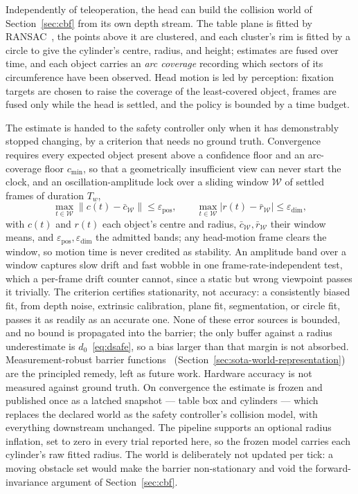 Independently of teleoperation, the head can build the collision world of Section~\ref{sec:cbf} from its own depth stream. The table plane is fitted by RANSAC~\cite{fischler1981ransac}, the points above it are clustered, and each cluster's rim is fitted by a circle to give the cylinder's centre, radius, and height; estimates are fused over time, and each object carries an \emph{arc coverage} recording which sectors of its circumference have been observed. Head motion is led by perception: fixation targets are chosen to raise the coverage of the least-covered object, frames are fused only while the head is settled, and the policy is bounded by a time budget.

The estimate is handed to the safety controller only when it has demonstrably stopped changing, by a criterion that needs no ground truth. Convergence requires every expected object present above a confidence floor and an arc-coverage floor $c_{\min}$, so that a geometrically insufficient view can never start the clock, and an oscillation-amplitude lock over a sliding window $\mathcal{W}$ of settled frames of duration $T_w$,
\begin{equation}
\max_{t \in \mathcal{W}} \bigl\|c(t) - \bar{c}_{\mathcal{W}}\bigr\| \le \varepsilon_{\text{pos}},
\qquad
\max_{t \in \mathcal{W}} \bigl|r(t) - \bar{r}_{\mathcal{W}}\bigr| \le \varepsilon_{\text{dim}},
\label{eq:amplock}
\end{equation}
with $c(t)$ and $r(t)$ each object's centre and radius, $\bar{c}_{\mathcal{W}}, \bar{r}_{\mathcal{W}}$ their window means, and $\varepsilon_{\text{pos}}, \varepsilon_{\text{dim}}$ the admitted bands; any head-motion frame clears the window, so motion time is never credited as stability. An amplitude band over a window captures slow drift and fast wobble in one frame-rate-independent test, which a per-frame drift counter cannot, since a static but wrong viewpoint passes it trivially. The criterion certifies stationarity, not accuracy: a consistently biased fit, from depth noise, extrinsic calibration, plane fit, segmentation, or circle fit, passes it as readily as an accurate one. None of these error sources is bounded, and no bound is propagated into the barrier; the only buffer against a radius underestimate is $d_0$~\eqref{eq:dsafe}, so a bias larger than that margin is not absorbed. Measurement-robust barrier functions~\cite{cosner2021mrcbf} (Section~\ref{sec:sota-world-representation}) are the principled remedy, left as future work. Hardware accuracy is not measured against ground truth. On convergence the estimate is frozen and published once as a latched snapshot --- table box and cylinders --- which replaces the declared world as the safety controller's collision model, with everything downstream unchanged. The pipeline supports an optional radius inflation, set to zero in every trial reported here, so the frozen model carries each cylinder's raw fitted radius. The world is deliberately not updated per tick: a moving obstacle set would make the barrier non-stationary and void the forward-invariance argument of Section~\ref{sec:cbf}.

